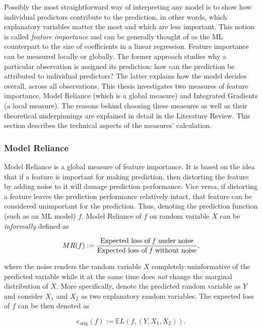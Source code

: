 		Possibly the most straightforward way of interpreting any model is to show how individual predictors contribute to the prediction, in other words, which explanatory variables matter the most and which are less important. This notion is called \textit{feature importance} and can be generally thought of as the ML counterpart to the size of coefficients in a linear regression. Feature importance can be measured locally or globally. The former approach studies why a particular observation is assigned its prediction: how can the prediction be attributed to individual predictors? The latter explains how the model decides overall, across all observations. This thesis investigates two measures of feature importance, Model Reliance \citep{fisher2019all} (which is a global measure) and Integrated Gradients \citep{sundararajan2017axiomatic} (a local measure). The reasons behind choosing these measures as well as their theoretical underpinnings are explained in detail in the Literature Review. This section describes the technical aspects of the measures' calculation.		
		
		\subsubsection{Model Reliance}
			Model Reliance \citep{fisher2019all} is a global measure of feature importance. It is based on the idea that if a feature is important for making prediction, then distorting the feature by adding noise to it will damage prediction performance. Vice versa, if distorting a feature leaves the prediction performance relatively intact, that feature can be considered unimportant for the prediction. Thus, denoting  the prediction function (such as an ML model) $f$, Model Reliance of  $f$ on random variable $X$ can be \textit{informally} defined as
			
			\begin{equation*}
				MR(f):=\frac{\text{Expected loss of \textit{f} under noise}}{\text{Expected loss of \textit{f} without noise}},
			\end{equation*}
			
			where the noise renders the random variable $X$ completely uninformative of the predicted variable while it at the same time does \textit{not} change the marginal distribution of $X$. More specifically, denote the predicted random variable as $Y$ and consider $X_1$ and $X_2$ as two explanatory random variables. The expected loss of $f$ can be then denoted as 
			
			\begin{equation*}
				e_{\text{orig}}(f):= \mathbb{E} L(f,(Y,X_1, X_2)).
			\end{equation*} 
			
